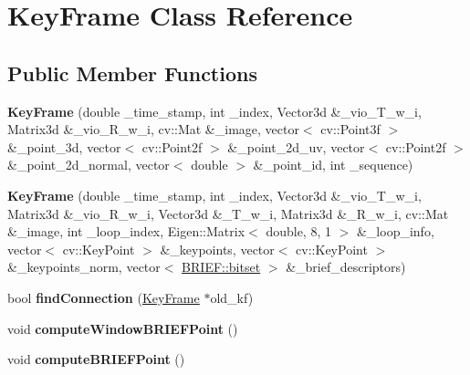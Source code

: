 \hypertarget{classKeyFrame}{}\section{Key\+Frame Class Reference}
\label{classKeyFrame}
\subsection*{Public Member Functions}
\begin{DoxyCompactItemize}
\item 
\mbox{\label{classKeyFrame_a2c9cb1c7f516c82a60208072fe91502f}} 
{\bfseries Key\+Frame} (double \+\_\+time\+\_\+stamp, int \+\_\+index, Vector3d \&\+\_\+vio\+\_\+\+T\+\_\+w\+\_\+i, Matrix3d \&\+\_\+vio\+\_\+\+R\+\_\+w\+\_\+i, cv\+::\+Mat \&\+\_\+image, vector$<$ cv\+::\+Point3f $>$ \&\+\_\+point\+\_\+3d, vector$<$ cv\+::\+Point2f $>$ \&\+\_\+point\+\_\+2d\+\_\+uv, vector$<$ cv\+::\+Point2f $>$ \&\+\_\+point\+\_\+2d\+\_\+normal, vector$<$ double $>$ \&\+\_\+point\+\_\+id, int \+\_\+sequence)
\item 
\mbox{\label{classKeyFrame_a5f5bf8c31462cbf62fd741c91bd5012a}} 
{\bfseries Key\+Frame} (double \+\_\+time\+\_\+stamp, int \+\_\+index, Vector3d \&\+\_\+vio\+\_\+\+T\+\_\+w\+\_\+i, Matrix3d \&\+\_\+vio\+\_\+\+R\+\_\+w\+\_\+i, Vector3d \&\+\_\+\+T\+\_\+w\+\_\+i, Matrix3d \&\+\_\+\+R\+\_\+w\+\_\+i, cv\+::\+Mat \&\+\_\+image, int \+\_\+loop\+\_\+index, Eigen\+::\+Matrix$<$ double, 8, 1 $>$ \&\+\_\+loop\+\_\+info, vector$<$ cv\+::\+Key\+Point $>$ \&\+\_\+keypoints, vector$<$ cv\+::\+Key\+Point $>$ \&\+\_\+keypoints\+\_\+norm, vector$<$ \hyperlink{classDVision_1_1BRIEF_abc56a095174a93b0741099f35230b7c5}{B\+R\+I\+E\+F\+::bitset} $>$ \&\+\_\+brief\+\_\+descriptors)
\item 
\mbox{\label{classKeyFrame_aaf4aa53cbb3626f2fd9976569f2b78fc}} 
bool {\bfseries find\+Connection} (\hyperlink{classKeyFrame}{Key\+Frame} $\ast$old\+\_\+kf)
\item 
\mbox{\label{classKeyFrame_a79c56cd9600bec5ce986aaf65949d539}} 
void {\bfseries compute\+Window\+B\+R\+I\+E\+F\+Point} ()
\item 
\mbox{\label{classKeyFrame_a324423664a8bdeea052940cceb69b531}} 
void {\bfseries compute\+B\+R\+I\+E\+F\+Point} ()

\end{DoxyCompactItemize}
